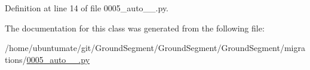 Definition at line 14 of file 0005\+\_\+auto\+\_\+\_.\+py.



The documentation for this class was generated from the following file\+:\begin{DoxyCompactItemize}
\item 
/home/ubuntumate/git/\+Ground\+Segment/\+Ground\+Segment/\+Ground\+Segment/migrations/\hyperlink{0005__auto__20161126__1606_8py}{0005\+\_\+auto\+\_\+\_.\+py}\end{DoxyCompactItemize}
